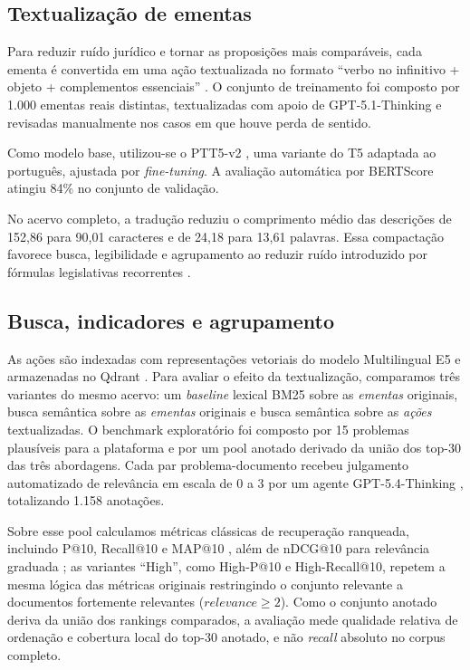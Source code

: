 \subsection{Textualização de ementas}

Para reduzir ruído jurídico e tornar as proposições mais comparáveis, cada ementa é convertida em uma ação textualizada no formato ``verbo no infinitivo + objeto + complementos essenciais'' \cite{allen_engholm_1980,manor_li_2019}. O conjunto de treinamento foi composto por 1.000 ementas reais distintas, textualizadas com apoio de GPT-5.1-Thinking \cite{openai_gpt51_model} e revisadas manualmente nos casos em que houve perda de sentido.

Como modelo base, utilizou-se o PTT5-v2 \cite{piau_ptt5v2_2024}, uma variante do T5 \cite{raffel_t5_2020} adaptada ao português, ajustada por \textit{fine-tuning}. A avaliação automática por BERTScore \cite{zhang_bertscore_2019} atingiu 84\% no conjunto de validação.

No acervo completo, a tradução reduziu o comprimento médio das descrições de 152,86 para 90,01 caracteres e de 24,18 para 13,61 palavras. Essa compactação favorece busca, legibilidade e agrupamento ao reduzir ruído introduzido por fórmulas legislativas recorrentes \cite{allen_engholm_1980,manor_li_2019}.

\subsection{Busca, indicadores e agrupamento}

As ações são indexadas com representações vetoriais do modelo Multilingual E5 \cite{wang_e5_2024} e armazenadas no Qdrant \cite{qdrant_overview}. Para avaliar o efeito da textualização, comparamos três variantes do mesmo acervo: um \textit{baseline} lexical BM25 sobre as \textit{ementas} originais, busca semântica sobre as \textit{ementas} originais e busca semântica sobre as \textit{ações} textualizadas. O benchmark exploratório foi composto por 15 problemas plausíveis para a plataforma e por um pool anotado derivado da união dos top-30 das três abordagens. Cada par problema-documento recebeu julgamento automatizado de relevância em escala de 0 a 3 por um agente GPT-5.4-Thinking \cite{openai_gpt54_model,rahmani_etal_2025_judgingjudges}, totalizando 1.158 anotações.

Sobre esse pool calculamos métricas clássicas de recuperação ranqueada, incluindo P@10, Recall@10 e MAP@10 \cite{buckley_voorhees_2000}, além de nDCG@10 para relevância graduada \cite{jarvelin_kekalainen_2002}; as variantes ``High'', como High-P@10 e High-Recall@10, repetem a mesma lógica das métricas originais restringindo o conjunto relevante a documentos fortemente relevantes ($relevance \geq 2$). Como o conjunto anotado deriva da união dos rankings comparados, a avaliação mede qualidade relativa de ordenação e cobertura local do top-30 anotado, e não \textit{recall} absoluto no corpus completo.


